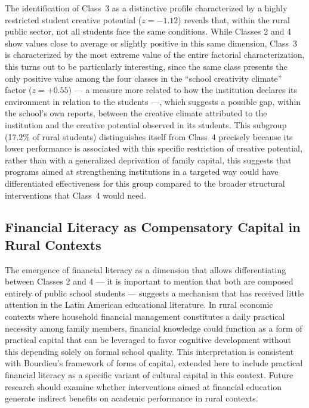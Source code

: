 \documentclass[runningheads]{llncs}
\begin{document}
The identification of Class~3 as a distinctive profile
characterized by a highly restricted student creative potential
(\(z = -1.12\)) reveals that, within the rural public sector, not
all students face the same conditions. While Classes 2 and 4 show
values close to average or slightly positive in this same
dimension, Class~3 is characterized by the most extreme value of
the entire factorial characterization, this turns out to be
particularly interesting, since the same class presents the only
positive value among the four classes in the ``school creativity
climate'' factor (\(z = +0.55\)) --- a measure more related to
how the institution declares its environment in relation to the
students ---, which suggests a possible gap, within the school's
own reports, between the creative climate attributed to the
institution and the creative potential observed in its students.
This subgroup (17.2\% of rural students) distinguishes itself
from Class~4 precisely because its lower performance is
associated with this specific restriction of creative potential,
rather than with a generalized deprivation of family capital,
this suggests that programs aimed at strengthening institutions
in a targeted way could have differentiated effectiveness for
this group compared to the broader structural interventions that
Class~4 would need.

\subsection{Financial Literacy as Compensatory Capital in Rural
Contexts}

The emergence of financial literacy as a dimension that allows
differentiating between Classes 2 and 4 --- it is important to
mention that both are composed entirely of public school
students --- suggests a mechanism that has received little
attention in the Latin American educational literature. In rural
economic contexts where household financial management
constitutes a daily practical necessity among family members,
financial knowledge could function as a form of practical
capital that can be leveraged to favor cognitive development
without this depending solely on formal school quality. This
interpretation is consistent with Bourdieu's framework of forms
of capital, extended here to include practical financial literacy
as a specific variant of cultural capital in this context. Future
research should examine whether interventions aimed at financial
education generate indirect benefits on academic performance in
rural contexts.
\end{document}
